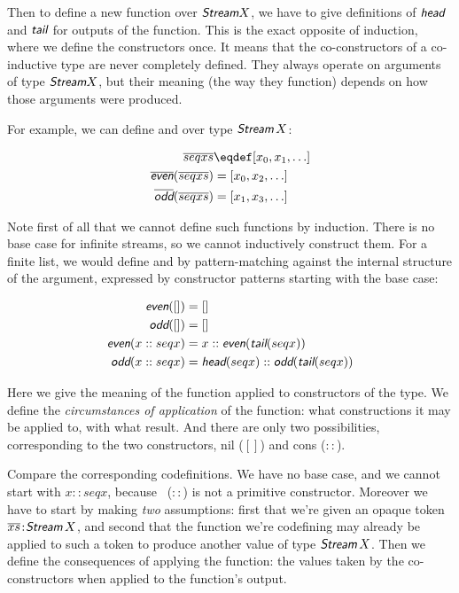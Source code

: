\documentclass{article}
\begin{document}
Then to define a new function over \(\Stream X\), we have to give
definitions of \(\head\) and \(\tail\) for outputs of the function.
This is the exact opposite of induction, where we define the
constructors once. It means that the co-constructors of a co-inductive
type are never completely defined. They always operate on arguments of
type \(\Stream X\), but their meaning (the way they function) depends
on how those arguments were produced.

For example, we can define  and  over type
\(\Stream\, X\):

\begin{align}
  \coseq{seq{x}} & \defeq [x_0, x_1, \ldots] \\
  \codefn{even}(\coseq{seq{x}}) & = [x_0, x_2, \ldots] \\
  \codefn{odd}(\coseq{seq{x}})  & = [x_1, x_3, \ldots]
\end{align}

Note first of all that we cannot define such functions by induction.
There is no base case for infinite streams, so we cannot inductively
construct them. For a finite list, we would define  and
 by pattern-matching against the internal structure of the
argument, expressed by constructor patterns starting with the base case:

\begin{align}
  \defn{even}([]) & = [] \\
  \defn{odd}([]) & = [] \\
  \defn{even}(x::seq{x}) & = x::\defn{even}(\tail(seq{x})) \\
  \defn{odd}(x::seq{x}) & = \head(seq{x})::\defn{odd}(\tail(seq{x}))
\end{align}

Here we give the meaning of the function applied to constructors of
the type. We define the \textit{circumstances of application} of the
function: what constructions it may be applied to, with what result.
And there are only two possibilities, corresponding to the two
constructors, nil (\([]\)) and cons (\(::\)).

Compare the corresponding codefinitions. We have no base case, and we
cannot start with \(x::seq{x}\), because \cons\ (\(::\)) is not a
primitive constructor. Moreover we have to start by making
\textit{two} assumptions: first that we're given an opaque token
\(\tj{\coseq{x}}{\Stream\,X}\), and second that the function we're
codefining may already be applied to such a token to produce another
value of type \(\Stream\, X\). Then we define the consequences of
applying the function: the values taken by the co-constructors when
applied to the function's output.
\end{document}
